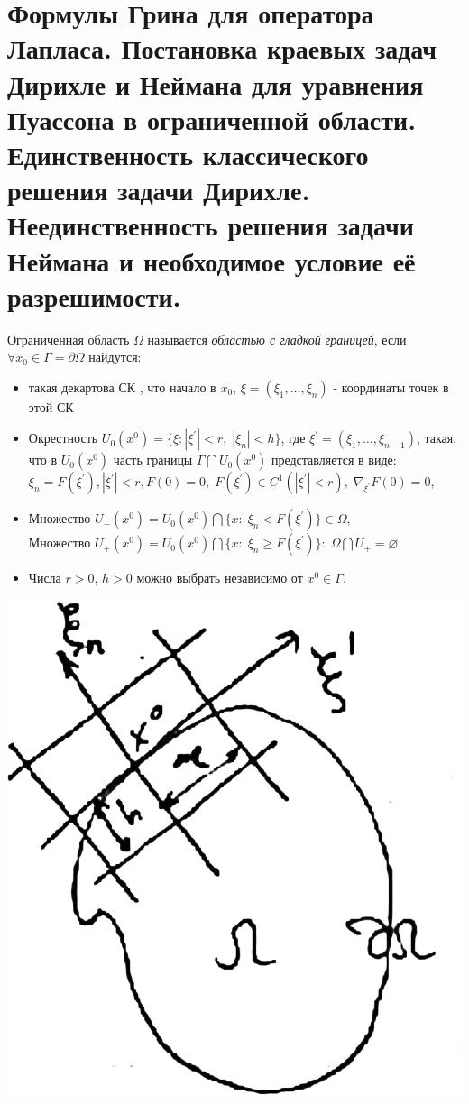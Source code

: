 \documentclass[../main.tex]{subfiles}
\begin{document}
\section{Формулы Грина для оператора Лапласа. Постановка краевых задач Дирихле и Неймана для уравнения Пуассона в ограниченной области. Единственность классического решения задачи Дирихле. Неединственность решения задачи Неймана и необходимое условие её разрешимости.}
\begin{definition}
Ограниченная область $\Omega$ называется \textit{областью с гладкой границей}, если $\forall x_0 \in \Gamma = \partial \Omega$ найдутся:
\begin{itemize}
\item такая декартова СК , что начало в $x_0$, $\xi = (\xi_1, \ldots, \xi_n)$ - координаты точек в этой СК
\item Окрестность $U_0(x^0) = \{\xi\colon |\xi^{'}| < r,\; |\xi_n| < h\}$, где $\xi^{'} = (\xi_1, \ldots, \xi_{n - 1})$, такая, что в $U_0(x^0)$ часть границы $\Gamma \bigcap U_0(x^0)$ представляется в виде: $\xi_n = F(\xi^{'}), |\xi^{'}| < r, F(0) = 0,\; F(\xi^{'}) \in C^1(|\xi^{'}| < r),\; \nabla_{\xi^{'}} F(0) = 0$, 
\item Множество $U_{-}(x^0) = U_0(x^0) \bigcap \{x\colon\; \xi_n < F(\xi^{'})\} \in \Omega$, \\
Множество $U_{+}(x^0) = U_0(x^0) \bigcap \{x\colon\; \xi_n \geq F(\xi^{'})\}\colon\; \Omega \bigcap U_{+} = \varnothing$
\item Числа $r > 0$, $h > 0$ можно выбрать независимо от $x^0 \in \Gamma$.
\end{itemize}
\end{definition}
\begin{minipage}{0.3\textwidth}
\begin{center}
\includegraphics[scale = 0.2]{14_1_new}
\end{center}
\end{minipage}
\end{document}
